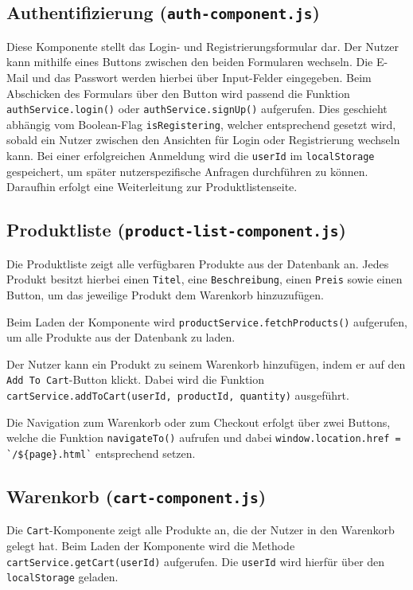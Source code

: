 \documentclass[oneside]{ausarbeitung}
\begin{document}
\subsection{Authentifizierung (\texttt{auth-component.js})}

Diese Komponente stellt das Login- und Registrierungsformular dar. Der Nutzer kann mithilfe eines Buttons zwischen den beiden Formularen wechseln. Die E-Mail und das Passwort werden hierbei über Input-Felder eingegeben. Beim Abschicken des Formulars über den Button wird passend die Funktion \texttt{authService.login()} oder \texttt{authService.signUp()} aufgerufen. Dies geschieht abhängig vom Boolean-Flag \texttt{isRegistering}, welcher entsprechend gesetzt wird, sobald ein Nutzer zwischen den Ansichten für Login oder Registrierung wechseln kann. Bei einer erfolgreichen Anmeldung wird die \texttt{userId} im \texttt{localStorage} gespeichert, um später nutzerspezifische Anfragen durchführen zu können. Daraufhin erfolgt eine Weiterleitung zur Produktlistenseite.

\subsection{Produktliste (\texttt{product-list-component.js})}

Die Produktliste zeigt alle verfügbaren Produkte aus der Datenbank an. Jedes Produkt besitzt hierbei einen \texttt{Titel}, eine \texttt{Beschreibung}, einen \texttt{Preis} sowie einen Button, um das jeweilige Produkt dem Warenkorb hinzuzufügen. 

Beim Laden der Komponente wird \texttt{productService.fetchProducts()} aufgerufen, um alle Produkte aus der Datenbank zu laden.

Der Nutzer kann ein Produkt zu seinem Warenkorb hinzufügen, indem er auf den \texttt{Add To Cart}-Button klickt. Dabei wird die Funktion \texttt{cartService.addToCart(userId, productId, quantity)} ausgeführt.

Die Navigation zum Warenkorb oder zum Checkout erfolgt über zwei Buttons, welche die Funktion \texttt{navigateTo()} aufrufen und dabei \texttt{window.location.href = \`{}/\$\{page\}.html\`} entsprechend setzen.


\subsection{Warenkorb (\texttt{cart-component.js})}

Die \texttt{Cart}-Komponente zeigt alle Produkte an, die der Nutzer in den Warenkorb gelegt hat. Beim Laden der Komponente wird die Methode \texttt{cartService.getCart(userId)} aufgerufen. Die \texttt{userId} wird hierfür über den \texttt{localStorage} geladen. 
\end{document}
